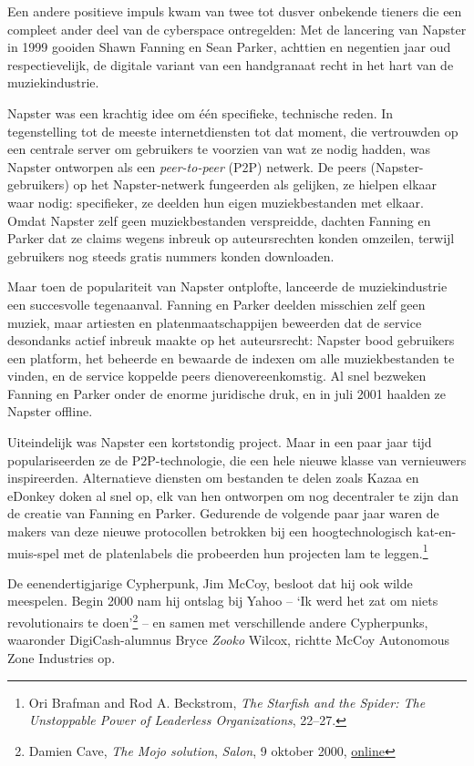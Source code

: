 \documentclass[
  a5paper,
  smalldemyvopaper,11pt,twoside,onecolumn,openright,extrafontsizes,
hidelinks]{memoir}
\begin{document}
Een andere positieve impuls kwam van twee tot dusver onbekende tieners
die een compleet ander deel van de cyberspace ontregelden: Met de
lancering van Napster in 1999 gooiden Shawn Fanning en Sean Parker,
achttien en negentien jaar oud respectievelijk, de digitale variant van
een handgranaat recht in het hart van de muziekindustrie.

Napster was een krachtig idee om één specifieke, technische reden. In
tegenstelling tot de meeste internetdiensten tot dat moment, die
vertrouwden op een centrale server om gebruikers te voorzien van wat ze
nodig hadden, was Napster ontworpen als een \emph{peer-to-peer} (P2P)
netwerk. De peers (Napster-gebruikers) op het Napster-netwerk fungeerden
als gelijken, ze hielpen elkaar waar nodig: specifieker, ze deelden hun
eigen muziekbestanden met elkaar. Omdat Napster zelf geen
muziekbestanden verspreidde, dachten Fanning en Parker dat ze claims
wegens inbreuk op auteursrechten konden omzeilen, terwijl gebruikers nog
steeds gratis nummers konden downloaden.

Maar toen de populariteit van Napster ontplofte, lanceerde de
muziekindustrie een succesvolle tegenaanval. Fanning en Parker deelden
misschien zelf geen muziek, maar artiesten en platenmaatschappijen
beweerden dat de service desondanks actief inbreuk maakte op het
auteursrecht: Napster bood gebruikers een platform, het beheerde en
bewaarde de indexen om alle muziekbestanden te vinden, en de service
koppelde peers dienovereenkomstig. Al snel bezweken Fanning en Parker
onder de enorme juridische druk, en in juli 2001 haalden ze Napster
offline.

Uiteindelijk was Napster een kortstondig project. Maar in een paar jaar
tijd populariseerden ze de P2P-technologie, die een hele nieuwe klasse
van vernieuwers inspireerden. Alternatieve diensten om bestanden te
delen zoals Kazaa en eDonkey doken al snel op, elk van hen ontworpen om
nog decentraler te zijn dan de creatie van Fanning en Parker. Gedurende
de volgende paar jaar waren de makers van deze nieuwe protocollen
betrokken bij een hoogtechnologisch kat-en-muis-spel met de platenlabels
die probeerden hun projecten lam te leggen.\footnote{Ori Brafman and Rod
  A. Beckstrom, \emph{The Starfish and the Spider: The Unstoppable Power
  of Leaderless Organizations}, 22--27.}

De eenendertigjarige Cypherpunk, Jim McCoy, besloot dat hij ook wilde
meespelen. Begin 2000 nam hij ontslag bij Yahoo -- `Ik werd het zat om
niets revolutionairs te doen'\footnote{Damien Cave, \emph{The Mojo
  solution}, \emph{Salon}, 9 oktober 2000,
  \href{https://www.salon.com/2000/10/09/mojo_nation/}{online}} -- en
samen met verschillende andere Cypherpunks, waaronder DigiCash-alumnus
Bryce \emph{Zooko} Wilcox, richtte McCoy Autonomous Zone Industries op.
\end{document}
